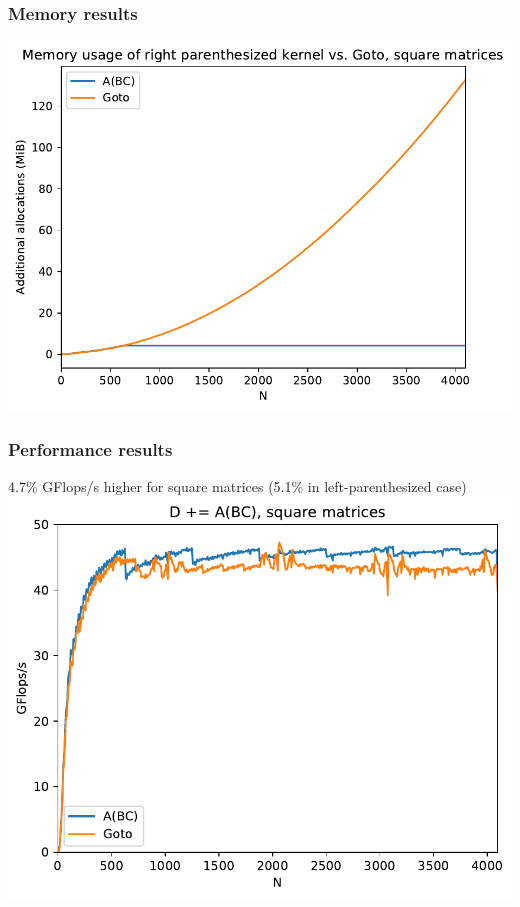 \documentclass{beamer}
\begin{document}
\begin{frame}
  \frametitle{Memory results}
  \includegraphics[height=0.9\textheight]{right-paren-memory}
\end{frame}

\begin{frame}
  \frametitle{Performance results}
  4.7\% GFlops/s higher for square matrices (5.1\% in left-parenthesized case)
  \includegraphics[height=0.9\textheight]{right-paren-plot}
\end{frame}
\end{document}
